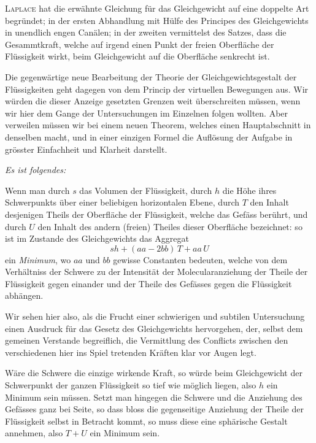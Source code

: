 \documentclass[12pt,a4paper]{article}
\begin{document}
\textsc{Laplace} hat die erwähnte Gleichung für das Gleichgewicht auf eine doppelte Art begründet; in der ersten Abhandlung mit Hülfe des Principes des Gleichgewichts in unendlich engen Canälen; in der zweiten vermittelst des Satzes, dass die Gesammtkraft, welche auf irgend einen Punkt der freien Oberfläche der Flüssigkeit wirkt, beim Gleichgewicht auf die Oberfläche senkrecht ist.

Die gegenwärtige neue Bearbeitung der Theorie der Gleichgewichtsgestalt der Flüssigkeiten geht dagegen von dem Princip der virtuellen Bewegungen aus. Wir würden die dieser Anzeige gesetzten Grenzen weit überschreiten müssen, wenn wir hier dem Gange der Untersuchungen im Einzelnen folgen wollten. Aber verweilen müssen wir bei einem neuen Theorem, welches einen Hauptabschnitt in denselben macht, und in einer einzigen Formel die Auflösung der Aufgabe in grösster Einfachheit und Klarheit darstellt.

\bigskip

\textit{Es ist folgendes:}

Wenn man durch $s$ das Volumen der Flüssigkeit, durch $h$ die Höhe ihres Schwerpunkts über einer beliebigen horizontalen Ebene, durch $T$ den Inhalt desjenigen Theils der Oberfläche der Flüssigkeit, welche das Gefäss berührt, und durch $U$ den Inhalt des andern (freien) Theiles dieser Oberfläche bezeichnet: so ist im Zustande des Gleichgewichts das Aggregat
\begin{equation*}
    sh + (aa - 2\mathit{bb})\,T + aa\,U
\end{equation*}
ein \textit{Minimum}, wo $aa$ und $\mathit{bb}$ gewisse Constanten bedeuten, welche von dem Verhältniss der Schwere zu der Intensität der Molecularanziehung der Theile der Flüssigkeit gegen einander und der Theile des Gefässes gegen die Flüssigkeit abhängen.

Wir sehen hier also, als die Frucht einer schwierigen und subtilen Untersuchung einen Ausdruck für das Gesetz des Gleichgewichts hervorgehen, der, selbst dem gemeinen Verstande begreiflich, die Vermittlung des Conflicts zwischen den verschiedenen hier ins Spiel tretenden Kräften klar vor Augen legt.

Wäre die Schwere die einzige wirkende Kraft, so würde beim Gleichgewicht der Schwerpunkt der ganzen Flüssigkeit so tief wie möglich liegen, also $h$ ein Minimum sein müssen. Setzt man hingegen die Schwere und die Anziehung des Gefässes ganz bei Seite, so dass bloss die gegenseitige Anziehung der Theile der Flüssigkeit selbst in Betracht kommt, so muss diese eine sphärische Gestalt annehmen, also $T + U$ ein Minimum sein.
\end{document}
